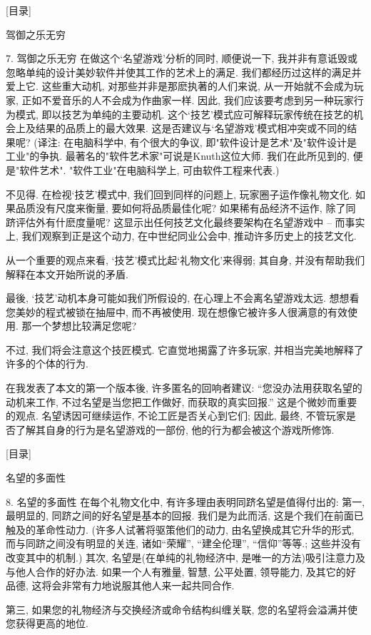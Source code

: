 \documentclass[a4paper,12pt,UTF8,twoside]{ctexbook}
\begin{document}
[目录]

驾御之乐无穷

7. 驾御之乐无穷
在做这个`名望游戏'分析的同时, 顺便说一下, 我并非有意诋毁或忽略单纯的设计美妙软件并使其工作的艺术上的满足. 我们都经历过这样的满足并爱上它. 这些重大动机, 对那些并非是那麽执著的人们来说, 从一开始就不会成为玩家, 正如不爱音乐的人不会成为作曲家一样.
因此, 我们应该要考虑到另一种玩家行为模式, 即以技艺为单纯的主要动机. 这个`技艺'模式应可解释玩家传统在技艺的机会上及结果的品质上的最大效果. 这是否建议与`名望游戏'模式相冲突或不同的结果呢?
(译注: 在电脑科学中, 有个很大的争议, 即"软件设计是艺术"及"软件设计是工业"的争执. 最著名的"软件艺术家"可说是Knuth这位大师. 我们在此所见到的, 便是"软件艺术". "软件工业"在电脑科学上, 可由软件工程来代表.)

不见得. 在检视`技艺'模式中, 我们回到同样的问题上, 玩家圈子运作像礼物文化. 如果品质没有尺度来衡量, 要如何将品质最佳化呢? 如果稀有品经济不运作, 除了同跻评估外有什麽度量呢? 这显示出任何技艺文化最终要架构在名望游戏中 -- 而事实上, 我们观察到正是这个动力, 在中世纪同业公会中, 推动许多历史上的技艺文化.

从一个重要的观点来看, `技艺'模式比起`礼物文化'来得弱; 其自身, 并没有帮助我们解释在本文开始所说的矛盾.

最後, `技艺'动机本身可能如我们所假设的, 在心理上不会离名望游戏太远. 想想看您美妙的程式被锁在抽屉中, 而不再被使用. 现在想像它被许多人很满意的有效使用. 那一个梦想比较满足您呢?

不过, 我们将会注意这个技匠模式. 它直觉地揭露了许多玩家, 并相当完美地解释了许多的个体的行为.

在我发表了本文的第一个版本後, 许多匿名的回响者建议: ``您没办法用获取名望的动机来工作, 不过名望是当您把工作做好, 而获取的真实回报.'' 这是个微妙而重要的观点. 名望诱因可继续运作, 不论工匠是否关心到它们; 因此, 最终, 不管玩家是否了解其自身的行为是名望游戏的一部份, 他的行为都会被这个游戏所修饰.


[目录]

名望的多面性

8. 名望的多面性
在每个礼物文化中, 有许多理由表明同跻名望是值得付出的:
第一, 最明显的, 同跻之间的好名望是基本的回报. 我们是为此而活, 这是个我们在前面已触及的革命性动力. (许多人试著将驱策他们的动力, 由名望换成其它升华的形式, 而与同跻之间没有明显的关连, 诸如``荣耀'', ``建全伦理'', ``信仰''等等.; 这些并没有改变其中的机制.)
其次, 名望是(在单纯的礼物经济中, 是唯一的方法)吸引注意力及与他人合作的好办法. 如果一个人有雅量, 智慧, 公平处置, 领导能力, 及其它的好品德, 这将会非常有力地说服其他人来一起共同合作.

第三, 如果您的礼物经济与交换经济或命令结构纠缠关联, 您的名望将会溢满并使您获得更高的地位.
\end{document}
